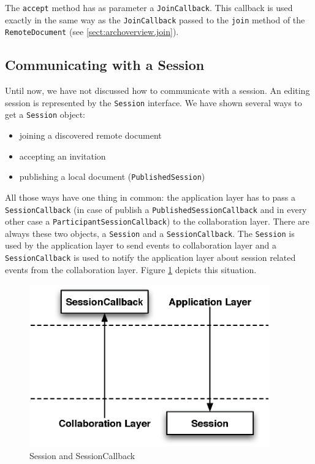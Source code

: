 The \texttt{accept} method has as parameter a \texttt{JoinCallback}. This
callback is used exactly in the same way as the \texttt{JoinCallback} passed
to the \texttt{join} method of the \texttt{RemoteDocument} 
(see \ref{sect:archoverview.join}).


\subsection{Communicating with a Session}
Until now, we have not discussed how to communicate with a session. An
editing session is represented by the \texttt{Session} interface.
We have shown several ways to get a \texttt{Session} object:

\begin{itemize}
 \item joining a discovered remote document
 \item accepting an invitation
 \item publishing a local document (\texttt{PublishedSession})
\end{itemize}

All those ways have one thing in common: the application layer has to pass a 
\texttt{SessionCallback}
(in case of publish a \texttt{PublishedSessionCallback} and in every
other case a \texttt{ParticipantSessionCallback}) to the collaboration
layer. There are always these two objects, a \texttt{Session} and
a \texttt{SessionCallback}. The \texttt{Session} is used by the application
layer to send events to collaboration layer and a \texttt{SessionCallback}
is used to notify the application layer about session related events from the 
collaboration layer. Figure \ref{fig:archoverview.sessionandcallback} depicts 
this situation.

\begin{figure}[H]
 \centering
 \includegraphics[width=10.37cm,height=7.02cm]{../images/finalreport/architecture_session_sessioncallback.eps}
 \caption{Session and SessionCallback}
 \label{fig:archoverview.sessionandcallback}
\end{figure}

